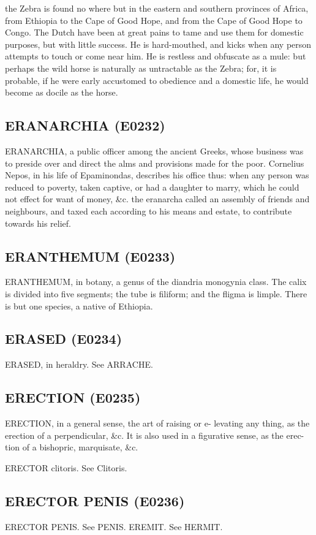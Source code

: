 \documentclass{article}
\begin{document}
the Zebra is found no where but in the eastern and southern provinces of Africa, from Ethiopia to the Cape of Good Hope, and from the Cape of Good Hope to Congo. The Dutch have been at great pains to tame and use them for domestic purposes, but with little success. He is hard-mouthed, and kicks when any person attempts to touch or come near him. He is restless and obfuscate as a mule: but perhaps the wild horse is naturally as untractable as the Zebra; for, it is probable, if he were early accustomed to obedience and a domestic life, he would become as docile as the horse.

\subsection*{ERANARCHIA (E0232)}
ERANARCHIA, a public officer among the ancient Greeks, whose business was to preside over and direct the alms and provisions made for the poor. Cornelius Nepos, in his life of Epaminondas, describes his office thus: when any person was reduced to poverty, taken captive, or had a daughter to marry, which he could not effect for want of money, \&c. the eranarcha called an assembly of friends and neighbours, and taxed each according to his means and estate, to contribute towards his relief.

\subsection*{ERANTHEMUM (E0233)}
ERANTHEMUM, in botany, a genus of the diandria monogynia class. The calix is divided into five segments; the tube is filiform; and the fligma is limple. There is but one species, a native of Ethiopia.

\subsection*{ERASED (E0234)}
ERASED, in heraldry. See ARRACHE.

\subsection*{ERECTION (E0235)}
ERECTION, in a general sense, the art of raising or e-
levating any thing, as the erection of a perpendicular,
\&c. It is also used in a figurative sense, as the erec-
tion of a bishopric, marquisate, \&c.

ERECTOR clitoris. See Clitoris.

\subsection*{ERECTOR PENIS (E0236)}
ERECTOR PENIS. See PENIS.
EREMIT. See HERMIT.
\end{document}
